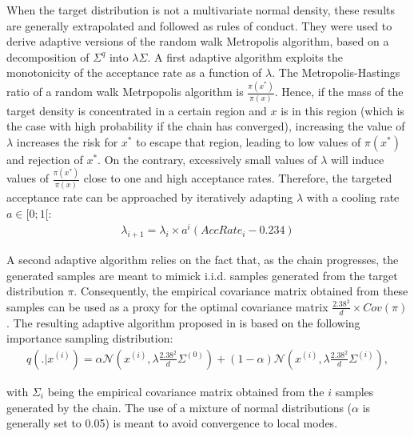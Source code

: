 \documentclass[a4paper,11pt,titlepage]{article}
\theoremstyle{plain} %
\begin{document}
When the target distribution is not a multivariate normal density, these results are generally extrapolated and followed as rules of conduct. They were used to derive adaptive versions of the random walk Metropolis algorithm, based on a decomposition of $\Sigma^q$ into $\lambda\Sigma$. A first adaptive algorithm exploits the monotonicity of the acceptance rate as a function of $\lambda$. The Metropolis-Hastings ratio of a random walk Metrpopolis algorithm is $\frac{\pi(x^*)}{\pi(x)}$. Hence, if the mass of the target density is concentrated in a certain region and $x$ is in this region (which is the case with high probability if the chain has converged), increasing the value of $\lambda$ increases the risk for $x^*$ to escape that region, leading to low values of $\pi(x^*)$ and rejection of $x^*$. On the contrary, excessively small values of $\lambda$ will induce values of $\frac{\pi(x^*)}{\pi(x)}$ close to one and high acceptance rates. Therefore, the targeted acceptance rate can be approached by iteratively adapting $\lambda$ with a cooling rate $a\in[0;1[$:
\begin{align}
	\lambda_{i+1} = \lambda_{i}\times a^i(AccRate_i-0.234)
\end{align}

A second adaptive algorithm relies on the fact that, as the chain progresses, the generated samples are meant to mimick i.i.d. samples generated from the target distribution $\pi$. Consequently, the empirical covariance matrix obtained from these samples can be used as a proxy for the optimal covariance matrix $\frac{2.38^2}{d}\times Cov(\pi)$. The resulting adaptive algorithm proposed in \cite{Roberts2009} is based on the following importance sampling distribution:
\begin{align}
q(.|x^{(i)})=\alpha \mathcal{N}\left(x^{(i)},\lambda\frac{2.38^2}{d}\Sigma^{(0)}\right) +(1-\alpha)\mathcal{N}\left(x^{(i)},\lambda\frac{2.38^2}{d}\Sigma^{(i)}\right),
\end{align}

with $\Sigma_i$ being the empirical  covariance matrix obtained from the $i$ samples generated by the chain. The use of a mixture of normal distributions ($\alpha$ is generally set to 0.05) is meant to avoid convergence to local modes.
\end{document}
